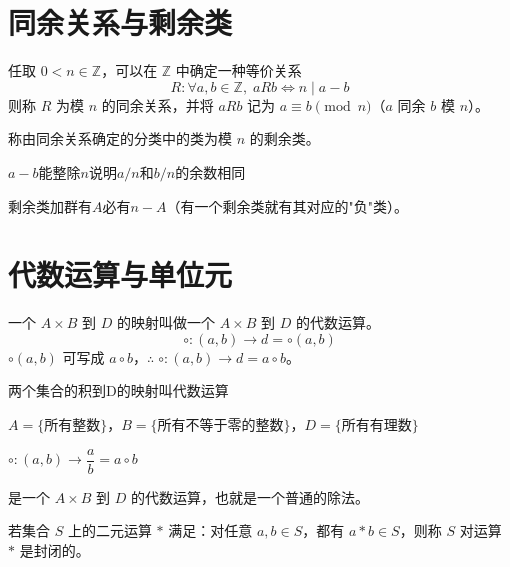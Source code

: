 \section{同余关系与剩余类}

\begin{definition}[模 $n$ 的同余关系与剩余类]
任取 $0<n\in\mathbb{Z}$，可以在 $\mathbb{Z}$ 中确定一种等价关系
\[
R:\forall a,b\in\mathbb{Z},\;aRb\Leftrightarrow n\mid a-b
\]
则称 $R$ 为模 $n$ 的同余关系，并将 $aRb$ 记为 $a\equiv b\pmod{n}$（$a$ 同余 $b$ 模 $n$）。

称由同余关系确定的分类中的类为模 $n$ 的剩余类。
\end{definition}

\begin{note}
$a-b$能整除$n$说明$a/n$和$b/n$的余数相同
\end{note}

\begin{note}[剩余类加群]
剩余类加群有$A$必有$n-A$（有一个剩余类就有其对应的"负"类）。
\end{note}

\section{代数运算与单位元}

\begin{definition}[代数运算]
一个 $A\times B$ 到 $D$ 的映射叫做一个 $A\times B$ 到 $D$ 的代数运算。
\[
\circ:(a,b)\to d=\circ(a,b)
\]
$\circ(a,b)$ 可写成 $a\circ b$，$\therefore\;\circ:(a,b)\to d=a\circ b$。
\end{definition}

\begin{note}[代数运算定义]
两个集合的积到D的映射叫代数运算
\end{note}

\begin{example}
$A=\{\text{所有整数}\}$，$B=\{\text{所有不等于零的整数}\}$，$D=\{\text{所有有理数}\}$

$\circ:(a,b)\to\dfrac{a}{b}=a\circ b$

是一个 $A\times B$ 到 $D$ 的代数运算，也就是一个普通的除法。
\end{example}

\begin{definition}[封闭性]
若集合 $S$ 上的二元运算 $*$ 满足：对任意 $a,b\in S$，都有 $a*b\in S$，则称 $S$ 对运算 $*$ 是封闭的。
\end{definition}

